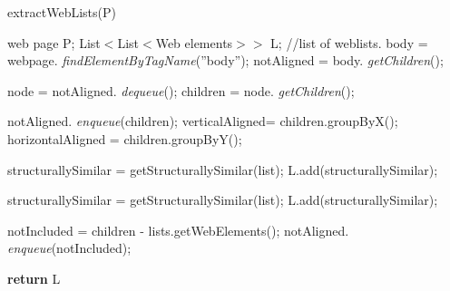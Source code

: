 \begin{algorithm}[H]
\caption{extractWebLists(P)}
\label{chap2alg:extractWebLists}
\begin{algorithmic}[1]
\renewcommand{\algorithmicrequire}{\textbf{Input:}}
\renewcommand{\algorithmicensure}{\textbf{Output:}}
\newcommand{\RETURN}[1]{\textbf{return} #1}
\renewcommand{\algorithmiccomment}[1]{$//$ \textit{#1}}
\renewcommand{\algorithmicforall}{\textbf{for each}}
\newcommand{\extractWebLists}[1]{ \textit{extractWebLists}(#1); }
\newcommand{\getChildren}[1]{ \textit{getChildren}(#1);}
\newcommand{\findElementByTagName}[1]{ \textit{findElementByTagName}(#1);}
\newcommand{\dequeue}[1]{ \textit{dequeue}(#1); }
\newcommand{\getVerticallyAligned}[1]{ \textit{getVerticallyAligned}(#1);}
\newcommand{\getHorizontallyAligned}[1]{ \textit{getHorizontallyAligned}(#1);}
\newcommand{\getStructurallySimilar}[1]{ \textit{getStructurallySimilar}(#1)}
\newcommand{\getNotAligned}[1]{ \textit{getNotAligned}(#1);}
\newcommand{\add}[1]{ \textit{add}(#1); }
\newcommand{\enqueue}[1]{ \textit{enqueue}(#1); }
\newcommand{\getUrls}[1]{ \textit{getUrls}(#1) }
\REQUIRE web page P;
\ENSURE List$<$List$<$Web elements$>>$ L; //list of weblists.
\STATE body = webpage.\findElementByTagName{''body''}
\STATE notAligned = body.\getChildren{}
\REPEAT 
	
	\STATE node = notAligned.\dequeue{}
	\STATE children = node.\getChildren{}
	
	\STATE notAligned.\enqueue{children}
	\ELSE 
    \STATE verticalAligned= children.groupByX();
    \STATE horizontalAligned = children.groupByY();
    
    \STATE structurallySimilar = getStructurallySimilar(list);
    \STATE L.add(structurallySimilar);
    \ENDIF
	\ENDFOR 
	
    \STATE structurallySimilar = getStructurallySimilar(list);
    \STATE L.add(structurallySimilar);
    \ENDIF
	\ENDFOR 
	
	\STATE notIncluded = children - lists.getWebElements();
	\STATE notAligned.\enqueue{notIncluded}
	\ENDIF


\RETURN{L}


\end{algorithmic}
\end{algorithm}

